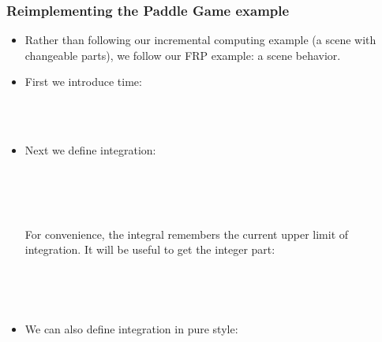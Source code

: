 \documentclass{beamer}
\begin{document}
\subsubsection{Reimplementing the Paddle Game example}

\begin{itemize}
  \item Rather than following our incremental computing example (a scene with
  changeable parts), we follow our FRP example: a scene behavior.
  
  \item First we introduce time:
  
  {}{}{\hlendline{}}\\
  {}{}{\hlopt{, }}{}{\hlopt{=
  }}{}{\hlopt{()}}{\hlendline{}}\\
  {}{}{\hlopt{= }}{}{\hlopt{(}}{}{}{}{\hlopt{())
  }}{}{\hlendline{}}
  
  \item Next we define integration:
  
  {}{}{\hlopt{=}}{\hlendline{}}\\
  {\hlstd{ \ }}{}{}{\hlopt{(}}{}{\hlopt{,
  }}{}{\hlopt{) }}{}{\hlopt{=}}{\hlendline{}}\\
  {}{}{}{}{}{}{}{\hlopt{, }}{}{}{\hlendline{}}\\
  {}{\hlopt{(}}{}{}{}{\hlopt{) }}{}{\hlendline{}}
  
  For convenience, the integral remembers the current upper limit of
  integration. It will be useful to get the integer part:
  
  {}{}{\hlopt{=}}{\hlendline{}}\\
  {}{\hlopt{(}}{}{\hlopt{(}}{}{\hlopt{,}}{\hlstd{{\textunderscore}}}{\hlopt{) ->
  }}{}{\hlopt{)
  (}}{}{\hlopt{)}}{\hlendline{}}
  
  \
  
  \item We can also define integration in pure style:
  

\end{itemize}
\end{document}
